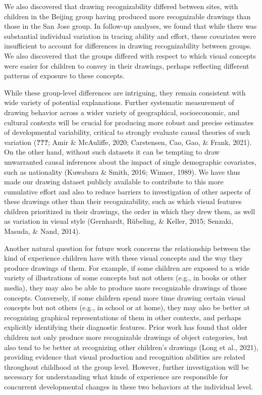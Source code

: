 \documentclass[
  english,
  man]{apa6}
\begin{document}
We also discovered that drawing recognizability differed between sites, with children in the Beijing group having produced more recognizable drawings than those in the San Jose group. In follow-up analyses, we found that while there was substantial individual variation in tracing ability and effort, these covariates were insufficient to account for differences in drawing recognizability between groups.
We also discovered that the groups differed with respect to which visual concepts were easier for children to convey in their drawings, perhaps reflecting different patterns of exposure to these concepts.

While these group-level differences are intriguing, they remain consistent with wide variety of potential explanations. Further systematic measurement of drawing behavior across a wider variety of geographical, socioeconomic, and cultural contexts will be crucial for producing more robust and precise estimates of developmental variability, critical to strongly evaluate causal theories of such variation ({\textbf{???}}; Amir \& McAuliffe, 2020; Carstensen, Cao, Gao, \& Frank, 2021). On the other hand, without such datasets it can be tempting to draw unwarranted causal inferences about the impact of single demographic covariates, such as nationality (Kuwabara \& Smith, 2016; Winner, 1989). We have thus made our drawing dataset publicly available to contribute to this more cumulative effort and also to reduce barriers to investigation of other aspects of these drawings other than their recognizability, such as which visual features children prioritized in their drawings, the order in which they drew them, as well as variation in visual style (Gernhardt, Rübeling, \& Keller, 2015; Senzaki, Masuda, \& Nand, 2014).

Another natural question for future work concerns the relationship between the kind of experience children have with these visual concepts and the way they produce drawings of them. For example, if some children are exposed to a wide variety of illustrations of some concepts but not others (e.g., in books or other media), they may also be able to produce more recognizable drawings of those concepts. Conversely, if some children spend more time drawing certain visual concepts but not others (e.g., in school or at home), they may also be better at recognizing graphical representations of them in other contexts, and perhaps explicitly identifying their diagnostic features. Prior work has found that older children not only produce more recognizable drawings of object categories, but also tend to be better at recognizing other children's drawings (Long et al., 2021), providing evidence that visual production and recognition abilities are related throughout childhood at the group level. However, further investigation will be necessary for understanding what kinds of experience are responsible for concurrent developmental changes in these two behaviors at the individual level.
\end{document}
